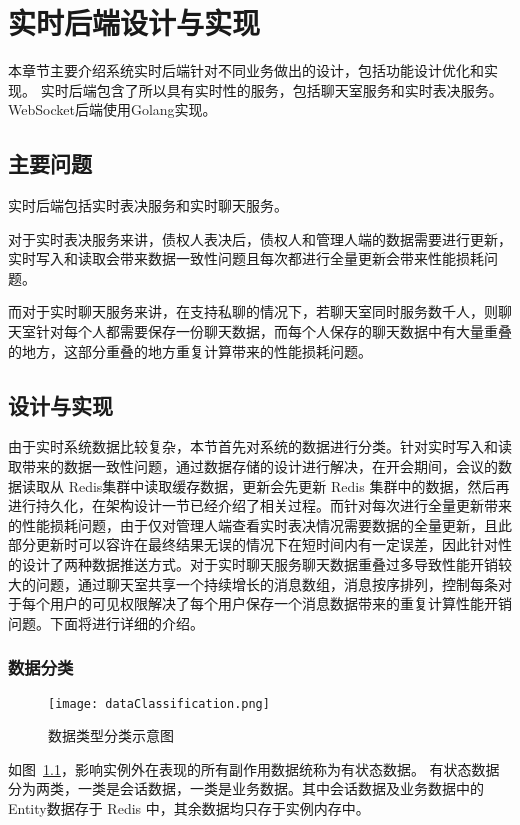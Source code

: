 
\chapter{实时后端设计与实现}
本章节主要介绍系统实时后端针对不同业务做出的设计，包括功能设计优化和实现。
实时后端包含了所以具有实时性的服务，包括聊天室服务和实时表决服务。WebSocket后端使用Golang实现。

  \section{主要问题}
  实时后端包括实时表决服务和实时聊天服务。
  
  对于实时表决服务来讲，债权人表决后，债权人和管理人端的数据需要进行更新，实时写入和读取会带来数据一致性问题且每次都进行全量更新会带来性能损耗问题。

  而对于实时聊天服务来讲，在支持私聊的情况下，若聊天室同时服务数千人，则聊天室针对每个人都需要保存一份聊天数据，而每个人保存的聊天数据中有大量重叠的地方，这部分重叠的地方重复计算带来的性能损耗问题。

  \section{设计与实现}
  由于实时系统数据比较复杂，本节首先对系统的数据进行分类。针对实时写入和读取带来的数据一致性问题，通过数据存储的设计进行解决，在开会期间，会议的数据读取从 Redis集群中读取缓存数据，更新会先更新 Redis 集群中的数据，然后再进行持久化，在架构设计一节已经介绍了相关过程。而针对每次进行全量更新带来的性能损耗问题，由于仅对管理人端查看实时表决情况需要数据的全量更新，且此部分更新时可以容许在最终结果无误的情况下在短时间内有一定误差，因此针对性的设计了两种数据推送方式。对于实时聊天服务聊天数据重叠过多导致性能开销较大的问题，通过聊天室共享一个持续增长的消息数组，消息按序排列，控制每条对于每个用户的可见权限解决了每个用户保存一个消息数据带来的重复计算性能开销问题。下面将进行详细的介绍。

  \subsection{数据分类}
\begin{figure}[!htp]
  \centering
  \texttt{[image: dataClassification.png]}
  \caption[数据分类]
    {数据类型分类示意图}
 \label{fig:dataClassification}
\end{figure}

如图~\ref{fig:dataClassification}，影响实例外在表现的所有副作用数据统称为有状态数据。
有状态数据分为两类，一类是会话数据，一类是业务数据。其中会话数据及业务数据中的Entity数据存于 Redis 中，其余数据均只存于实例内存中。

